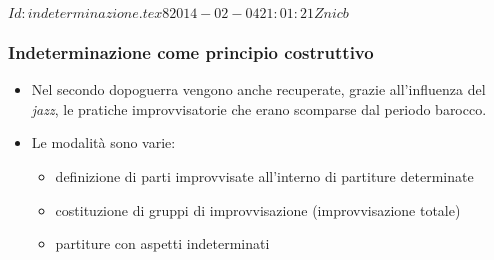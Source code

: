 %
%
\svnInfo $Id: indeterminazione.tex 8 2014-02-04 21:01:21Z nicb $

\setcounter{ms}{0}
\begin{frame}
    \frametitle{Indeterminazione come principio costruttivo}

    \begin{itemize}

        \item Nel secondo dopoguerra vengono anche recuperate,
            grazie all'influenza del \emph{jazz},
            le pratiche improvvisatorie che erano scomparse dal periodo barocco.

        \item Le modalit\`a sono varie:

        \begin{itemize}

            \item definizione di parti improvvisate
                all'interno di partiture determinate

            \item costituzione di gruppi di improvvisazione
                (improvvisazione totale)

            \item partiture con aspetti indeterminati

        \end{itemize}

    \end{itemize}

\end{frame}
